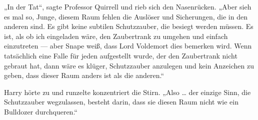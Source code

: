 „In der Tat“, sagte Professor Quirrell und rieb sich den Nasenrücken.
„Aber sieh es mal so, Junge, diesem Raum fehlen die Auslöser und Sicherungen, die in den anderen sind. Es gibt keine subtilen Schutzzauber, die besiegt werden müssen. Es ist, als ob ich eingeladen wäre, den Zaubertrank zu umgehen und einfach einzutreten — aber Snape weiß, dass Lord Voldemort dies bemerken wird. Wenn tatsächlich eine Falle für jeden aufgestellt wurde, der den Zaubertrank nicht gebraut hat, dann wäre es klüger, Schutzzauber anzulegen und kein Anzeichen zu geben, dass dieser Raum anders ist als die anderen.“

Harry hörte zu und runzelte konzentriert die Stirn.
„Also … der einzige Sinn, die Schutzzauber wegzulassen, besteht darin, dass sie diesen Raum nicht wie ein Bulldozer durchqueren.“

